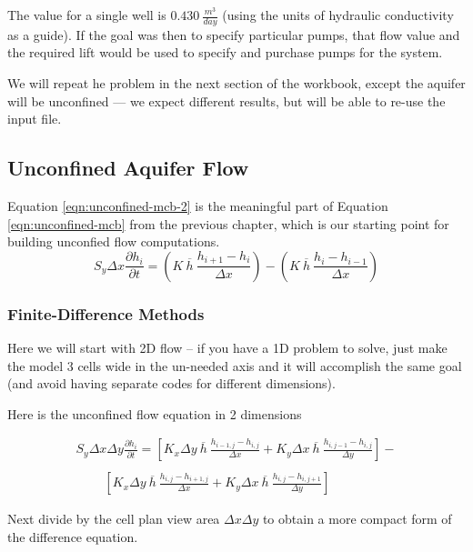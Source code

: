 The value for a single well is $0.430~\frac{m^3}{day}$ (using the units of hydraulic conductivity as a guide).  
If the goal was then to specify particular pumps, that flow value and the required lift would be used to specify and purchase pumps for the system. 

We will repeat he problem in the next section of the workbook, except the aquifer will be unconfined --- we expect different results, but will be able to re-use the input file.


\subsection{Unconfined Aquifer Flow}
Equation \ref{eqn:unconfined-mcb-2} is the meaningful part of Equation \ref{eqn:unconfined-mcb} from the previous chapter, which is our starting point for building unconfied flow computations.
\begin{equation}
S_{y} \Delta x  \frac{\partial h_i}{\partial t} = 
(K ~\overline{h}~ \frac{h_{i+1} - h_{i}}{\Delta x}) - 
(K ~\overline{h}~ \frac{h_{i} - h_{i-1}}{\Delta x})
\label{eqn:unconfined-mcb-2}
\end{equation}

\subsubsection{Finite-Difference Methods}
Here we will start with 2D flow -- if you have a 1D problem to solve, just make the model 3 cells wide in the un-needed axis and it will accomplish the same goal (and avoid having separate codes for different dimensions).

Here is the unconfined flow equation in 2 dimensions

\begin{equation}
\begin{matrix}
S_{y} \Delta x \Delta y \frac{\partial h_i}{\partial t} = 
[ K_{x} \Delta y ~\overline{h}~ \frac{h_{i-1,j} - h_{i,j}}{\Delta x} +
 K_{y} \Delta x ~\overline{h}~ \frac{h_{i,j-1} - h_{i,j}}{\Delta y}] - \\
~~~~~~~~~~\\
~~~~~~~~~~[ K_{x} \Delta y ~\overline{h}~ \frac{h_{i,j} - h_{i+1,j}}{\Delta x} +
K_{y} \Delta x ~\overline{h}~ \frac{h_{i,j} - h_{i,j+1}}{\Delta y} ]        
\end{matrix}        
\end{equation}

Next divide by the cell plan view area $\Delta x \Delta y$ to obtain a more compact form of the difference equation.

